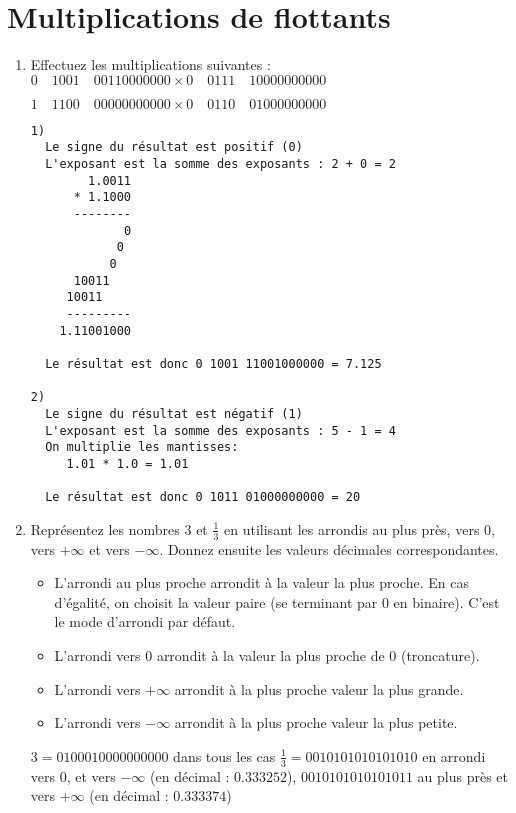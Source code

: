 \documentclass[a4paper,10pt]{exam}
\begin{document}
\section{Multiplications de flottants}
\begin{enumerate}
\item Effectuez les multiplications suivantes :\\
$0\quad 1001\quad 00110000000 \times 0\quad  0111\quad  10000000000$

$1\quad 1100\quad 00000000000 \times 0\quad  0110\quad  01000000000$
\begin{solution}
\begin{verbatim}
1)
  Le signe du résultat est positif (0)
  L'exposant est la somme des exposants : 2 + 0 = 2
        1.0011
      * 1.1000
      --------
             0
            0
           0
      10011
     10011
     ---------
    1.11001000

  Le résultat est donc 0 1001 11001000000 = 7.125

2)
  Le signe du résultat est négatif (1)
  L'exposant est la somme des exposants : 5 - 1 = 4
  On multiplie les mantisses:
     1.01 * 1.0 = 1.01

  Le résultat est donc 0 1011 01000000000 = 20
\end{verbatim}

\end{solution}

\item Repr\'esentez les nombres $3$ et $\frac{1}{3}$ en utilisant les arrondis
  au plus pr\`es, vers 0, vers $+\infty$ et vers $-\infty$. Donnez ensuite les valeurs d\'ecimales correspondantes.

\begin{solution}
\begin{itemize}
\item L'arrondi au plus proche arrondit \`a la valeur la plus proche. En cas d'\'egalit\'e, on choisit la valeur paire (se terminant par 0 en binaire). C'est le mode d'arrondi par d\'efaut.
\item L'arrondi vers 0 arrondit \`a la valeur la plus proche de 0 (troncature).
\item L'arrondi vers $+\infty$ arrondit \`a la plus proche valeur la plus grande.
\item L'arrondi vers $-\infty$ arrondit \`a la plus proche valeur la plus petite.

\end{itemize}
$3 = 0 1000 10000000000$ dans tous les cas
$\frac{1}{3} = 0 0101 01010101010$ en arrondi vers 0, et vers $-\infty$ (en
d\'ecimal : $0.333252$), $0 0101 01010101011$  au plus pr\`es et vers $+\infty$ (en d\'ecimal : $0.333374$)
\end{solution}


\end{enumerate}
\end{document}
